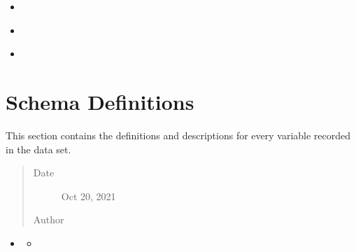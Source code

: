 \documentclass[letterpaper,10pt,english]{sphinxmanual}
\begin{document}
\begin{enumerate}
\begin{itemize}
\begin{sphinxShadowBox}
\begin{itemize}
\begin{itemize}
\begin{itemize}
\item {} 
\sphinxAtStartPar
{}\label{\detokenize{schema_tables:id137}}{\hyperref[\detokenize{schema_tables:human-rights-offense-table}]{}}

\item {} 
\sphinxAtStartPar
{}\label{\detokenize{schema_tables:id138}}{\hyperref[\detokenize{schema_tables:region-table}]{}}

\item {} 
\sphinxAtStartPar
{}\label{\detokenize{schema_tables:id139}}{\hyperref[\detokenize{schema_tables:province-table}]{}}

\end{itemize}

\end{itemize}

\end{itemize}
\end{sphinxShadowBox}


\section{Schema Definitions}
\label{\detokenize{schema_tables:schema-definitions}}
\begin{sphinxShadowBox}

\sphinxAtStartPar
This section contains the definitions and descriptions for every variable recorded in the data set.
\begin{quote}\begin{description}
\item[{Date}] \leavevmode
\sphinxAtStartPar
Oct 20, 2021

\item[{Author}] \leavevmode
\sphinxAtStartPar
{}

\end{description}\end{quote}
\end{sphinxShadowBox}

\begin{sphinxShadowBox}
\begin{itemize}
\item {} 
\sphinxAtStartPar
{}\label{\detokenize{schema_tables:id140}}{\hyperref[\detokenize{schema_tables:year}]{}}
\begin{itemize}
\item {} 
\sphinxAtStartPar
{}\label{\detokenize{schema_tables:id141}}{\hyperref[\detokenize{schema_tables:definition}]{}}


\end{itemize}
\end{itemize}
\end{sphinxShadowBox}
\end{itemize}
\end{enumerate}
\end{document}
